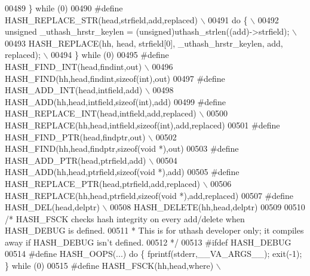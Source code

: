 \begin{DoxyCode}
{{{00489 \textcolor{preprocessor}{\} while (0)}
00490 \textcolor{preprocessor}{#define HASH\_REPLACE\_STR(head,strfield,add,replaced)                             \(\backslash\)}
00491 \textcolor{preprocessor}{do \{                                                                             \(\backslash\)}
00492 \textcolor{preprocessor}{    unsigned \_uthash\_hrstr\_keylen = (unsigned)uthash\_strlen((add)->strfield);    \(\backslash\)}
00493 \textcolor{preprocessor}{    HASH\_REPLACE(hh, head, strfield[0], \_uthash\_hrstr\_keylen, add, replaced);    \(\backslash\)}
00494 \textcolor{preprocessor}{\} while (0)}
00495 \textcolor{preprocessor}{#define HASH\_FIND\_INT(head,findint,out)                                          \(\backslash\)}
00496 \textcolor{preprocessor}{    HASH\_FIND(hh,head,findint,sizeof(int),out)}
00497 \textcolor{preprocessor}{#define HASH\_ADD\_INT(head,intfield,add)                                          \(\backslash\)}
00498 \textcolor{preprocessor}{    HASH\_ADD(hh,head,intfield,sizeof(int),add)}
00499 \textcolor{preprocessor}{#define HASH\_REPLACE\_INT(head,intfield,add,replaced)                             \(\backslash\)}
00500 \textcolor{preprocessor}{    HASH\_REPLACE(hh,head,intfield,sizeof(int),add,replaced)}
00501 \textcolor{preprocessor}{#define HASH\_FIND\_PTR(head,findptr,out)                                          \(\backslash\)}
00502 \textcolor{preprocessor}{    HASH\_FIND(hh,head,findptr,sizeof(void *),out)}
00503 \textcolor{preprocessor}{#define HASH\_ADD\_PTR(head,ptrfield,add)                                          \(\backslash\)}
00504 \textcolor{preprocessor}{    HASH\_ADD(hh,head,ptrfield,sizeof(void *),add)}
00505 \textcolor{preprocessor}{#define HASH\_REPLACE\_PTR(head,ptrfield,add,replaced)                             \(\backslash\)}
00506 \textcolor{preprocessor}{    HASH\_REPLACE(hh,head,ptrfield,sizeof(void *),add,replaced)}
00507 \textcolor{preprocessor}{#define HASH\_DEL(head,delptr)                                                    \(\backslash\)}
00508 \textcolor{preprocessor}{    HASH\_DELETE(hh,head,delptr)}
00509 
00510 \textcolor{comment}{/* HASH\_FSCK checks hash integrity on every add/delete when HASH\_DEBUG is defined.}
00511 \textcolor{comment}{ * This is for uthash developer only; it compiles away if HASH\_DEBUG isn't defined.}
00512 \textcolor{comment}{ */}
00513 \textcolor{preprocessor}{#ifdef HASH\_DEBUG}
00514 \textcolor{preprocessor}{#define HASH\_OOPS(...) do \{ fprintf(stderr,\_\_VA\_ARGS\_\_); exit(-1); \} while (0)}
00515 \textcolor{preprocessor}{#define HASH\_FSCK(hh,head,where)                                                 \(\backslash\)}
}}}
\end{DoxyCode}
